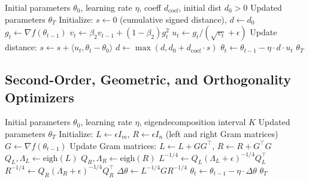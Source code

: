\documentclass[11pt,a4paper]{article}
\begin{document}
\begin{algorithm}[H]
\caption{Prodigy (Approximating the Distance Estimate)}
\label{alg:prodigy}
\begin{algorithmic}[1]
\Require Initial parameters $\theta_0$, learning rate $\eta$, coeff $d_{\text{coef}}$, initial dist $d_0 > 0$
\Ensure Updated parameters $\theta_T$
\State Initialize: $s \gets 0$ (cumulative signed distance), $d \gets d_0$
    \State $g_t \gets \nabla f(\theta_{t-1})$
    \State $v_t \gets \beta_2 v_{t-1} + (1-\beta_2) g_t^2$ 
    \State $u_t \gets g_t / (\sqrt{v_t} + \epsilon)$ 
    \State Update distance: $s \gets s + \langle u_t, \theta_t - \theta_0 \rangle$ 
    \State $d \gets \max(d, d_0 + d_{\text{coef}} \cdot s)$ 
    \State $\theta_t \gets \theta_{t-1} - \eta \cdot d \cdot u_t$ 
\EndFor
\Return $\theta_T$
\end{algorithmic}
\end{algorithm}

\subsection{Second-Order, Geometric, and Orthogonality Optimizers}

\begin{algorithm}[H]
\caption{Shampoo (Matrix Preconditioning via Kronecker Products)}
\label{alg:shampoo}
\begin{algorithmic}[1]
\Require Initial parameters $\theta_0$, learning rate $\eta$, eigendecomposition interval $K$
\Ensure Updated parameters $\theta_T$
\State Initialize: $L \gets \epsilon I_m$, $R \gets \epsilon I_n$ (left and right Gram matrices)
    \State $G \gets \nabla f(\theta_{t-1})$ 
    \State Update Gram matrices: $L \gets L + G G^\top$, $R \gets R + G^\top G$
        \State $Q_L, \Lambda_L \gets \text{eigh}(L)$ 
        \State $Q_R, \Lambda_R \gets \text{eigh}(R)$ 
        \State $L^{-1/4} \gets Q_L (\Lambda_L + \epsilon)^{-1/4} Q_L^\top$
        \State $R^{-1/4} \gets Q_R (\Lambda_R + \epsilon)^{-1/4} Q_R^\top$
    \EndIf
    \State $\Delta \theta \gets L^{-1/4} G R^{-1/4}$ 
    \State $\theta_t \gets \theta_{t-1} - \eta \cdot \Delta \theta$
\EndFor
\Return $\theta_T$
\end{algorithmic}
\end{algorithm}
\end{document}
